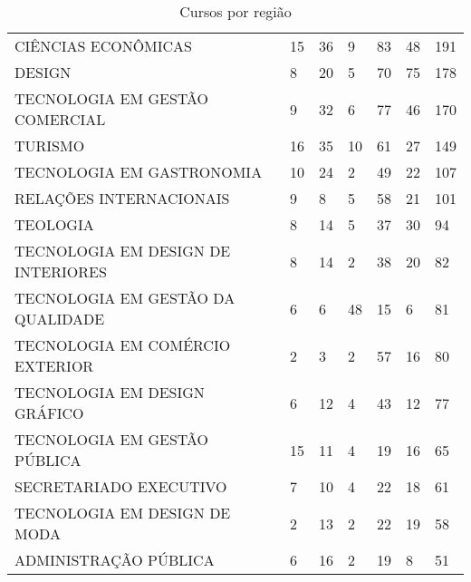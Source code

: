 \begin{table}[H]
{\begin{tabular}{@{}lllllll@{}}
CIÊNCIAS ECONÔMICAS                      & 15                    & 36                & 9              & 83               & 48           & 191            \\
DESIGN                                   & 8                     & 20                & 5              & 70               & 75           & 178            \\
TECNOLOGIA EM GESTÃO COMERCIAL           & 9                     & 32                & 6              & 77               & 46           & 170            \\
TURISMO                                  & 16                    & 35                & 10             & 61               & 27           & 149            \\
TECNOLOGIA EM GASTRONOMIA                & 10                    & 24                & 2              & 49               & 22           & 107            \\
RELAÇÕES INTERNACIONAIS                  & 9                     & 8                 & 5              & 58               & 21           & 101            \\
TEOLOGIA                                 & 8                     & 14                & 5              & 37               & 30           & 94             \\
TECNOLOGIA EM DESIGN DE INTERIORES       & 8                     & 14                & 2              & 38               & 20           & 82             \\
TECNOLOGIA EM GESTÃO DA QUALIDADE        & 6                     & 6                 & 48             & 15               & 6            & 81             \\
TECNOLOGIA EM COMÉRCIO EXTERIOR          & 2                     & 3                 & 2              & 57               & 16           & 80             \\
TECNOLOGIA EM DESIGN GRÁFICO             & 6                     & 12                & 4              & 43               & 12           & 77             \\
TECNOLOGIA EM GESTÃO PÚBLICA             & 15                    & 11                & 4              & 19               & 16           & 65             \\
SECRETARIADO EXECUTIVO                   & 7                     & 10                & 4              & 22               & 18           & 61             \\
TECNOLOGIA EM DESIGN DE MODA             & 2                     & 13                & 2              & 22               & 19           & 58             \\
ADMINISTRAÇÃO PÚBLICA                    & 6                     & 16                & 2              & 19               & 8            & 51             \\ \bottomrule
\end{tabular}%
}
\caption{Cursos por região}
\label{my-label}
\end{table}